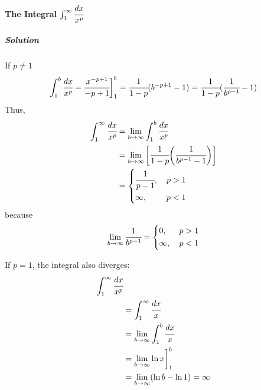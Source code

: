 \documentclass{article}
\begin{document}
            \paragraph{The Integral $\int_1^\infty \cfrac{dx}{x^p}$}
                \subparagraph{Solution} If $p\ne 1$
                \[\int_1^b\cfrac{dx}{x^p}=\cfrac{x^{-p+1}}{-p+1}\bigg]_1^b=\cfrac{1}{1-p}(b^{-p+1}-1)=\cfrac{1}{1-p}(\cfrac{1}{b^{p-1}}-1)\]
                Thus,
                \begin{equation}
                    \begin{aligned}
                        \int_1^\infty\cfrac{dx}{x^p}&=\lim\limits_{b\to\infty}\int_1^b\cfrac{dx}{x^p}\\
                        &=\lim\limits_{b\to \infty}\bigg[\cfrac{1}{1-p}\bigg(\cfrac{1}{b^{p-1}-1}\bigg)\bigg]\\
                        &=\left\{
                            \begin{aligned}
                                &\cfrac{1}{p-1},\quad p>1\\
                                &\infty,\qquad\  p<1\\
                            \end{aligned}
                        \right.
                    \end{aligned}
                \end{equation}
                because
                \[\lim\limits_{b\to\infty}\cfrac{1}{b^{p-1}}=\left\{
                    \begin{aligned}
                        &0,\quad\ \, p>1\\
                        &\infty,\quad p<1\\
                    \end{aligned}    
                \right.
                \]
                \par If $p=1$, the integral also diverges:
                \begin{equation}
                    \begin{aligned}
                        \int_1^\infty \cfrac{dx}{x^p}&\\
                        &=\int_1^\infty\cfrac{dx}{x}\\
                        &=\lim\limits_{b\to\infty}\int_1^b\cfrac{dx}{x}\\
                        &=\lim\limits_{b\to\infty}\ln x\bigg]_1^b\\
                        &=\lim\limits_{b\to\infty}(\ln b-\ln 1)=\infty
                    \end{aligned}
                \end{equation}
\end{document}
